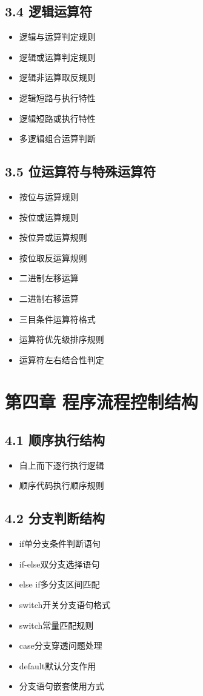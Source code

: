 \subsection{3.4 逻辑运算符}
\begin{itemize}
\item 逻辑与运算判定规则
\item 逻辑或运算判定规则
\item 逻辑非运算取反规则
\item 逻辑短路与执行特性
\item 逻辑短路或执行特性
\item 多逻辑组合运算判断
\end{itemize}

\subsection{3.5 位运算符与特殊运算符}
\begin{itemize}
\item 按位与运算规则
\item 按位或运算规则
\item 按位异或运算规则
\item 按位取反运算规则
\item 二进制左移运算
\item 二进制右移运算
\item 三目条件运算符格式
\item 运算符优先级排序规则
\item 运算符左右结合性判定
\end{itemize}

\section{第四章 程序流程控制结构}
\subsection{4.1 顺序执行结构}
\begin{itemize}
\item 自上而下逐行执行逻辑
\item 顺序代码执行顺序规则
\end{itemize}

\subsection{4.2 分支判断结构}
\begin{itemize}
\item if单分支条件判断语句
\item if-else双分支选择语句
\item else if多分支区间匹配
\item switch开关分支语句格式
\item switch常量匹配规则
\item case分支穿透问题处理
\item default默认分支作用
\item 分支语句嵌套使用方式
\end{itemize}


